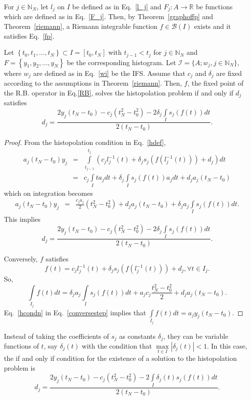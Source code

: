 \documentclass[sn-mathphys-num]{sn-jnl}
\numberwithin{equation}{section}
\begin{document}
\noindent For $j\in\mathbb N_N$, let $l_j$ on $I$ be defined as in Eq.~\eqref{l_j} and $F_j: A\rightarrow\mathbb{R}$ be functions which are defined as in Eq.~\eqref{F_j}. Then, by Theorem~\ref{graphoffp} and Theorem~\ref{riemann}, a Riemann integrable function $f\in\mathcal{B}(I)$ exists and it satisfies Eq.~\eqref{fp}.
\begin{theorem}
Let $\left\{t_0,t_1,\ldots, t_N\right\}\subset I=[t_0,t_N]$ with $t_{j-1} < t_j$ for $j\in\mathbb N_N$ and $F=\left\{y_1,y_2,\ldots, y_N\right\}$ be the corresponding histogram. Let $\mathcal{I}=\{A;w_j,j\in\mathbb N_N\}$, where $w_j$ are defined as in Eq.~\eqref{wi} be the IFS. Assume that $c_j$ and $\delta_j$ are fixed according to the assumptions in Theorem~\ref{riemann}. Then, $f$, the fixed point of the R.B. operator in Eq.\eqref{RB}, solves the histopolation problem if and only if $d_j$ satisfies
\begin{equation}
d_j=\frac{2y_j(t_N-t_0)-c_j(t_N^2-t_0^2)-2\delta_j\int\limits_Is_j(f(t))dt}{2(t_N-t_0)}.\label{hcondn}
\end{equation}
\end{theorem}
\begin{proof}
From the histopolation condition in Eq.~\eqref{hdef},
\begin{eqnarray*}
a_j(t_N-t_0)y_j %
&=&\int\limits_{t_{j-1}}^{t_j}(c_jl_j^{-1}(t)+\delta_js_j(f(l_j^{-1}(t)))+d_j)dt\\
&=&c_j\int\limits_{I}ta_jdt+\delta_j\int\limits_{I}s_j(f(t))a_jdt+d_ja_j(t_N-t_0)
\end{eqnarray*}
which on integration becomes
\begin{eqnarray*}
a_j(t_N-t_0)y_j&=&\frac{c_ja_j}{2}(t_N^2-t_0^2)+d_ja_j(t_N-t_0)+\delta_ja_j\int\limits_{I}s_j(f(t))dt.
\end{eqnarray*}
This implies $$d_j=\frac{2y_j(t_N-t_0)-c_j(t_N^2-t_0^2)-2\delta_j\int\limits_Is_j(f(t))dt}{2(t_N-t_0)}.$$

Conversely,  $f$ satisfies 
\begin{equation*}
	f(t)=c_jl_j^{-1}(t)+\delta_js_j(f(l_j^{-1}(t)))+d_j, \forall t\in I_j.
\end{equation*}
So,
\begin{equation}
	\int\limits_{I_j}f(t)dt=\delta_ja_j\int\limits_{I}s_j(f(t))dt+a_jc_j\frac{t_N^2-t_0^2}{2}+d_ja_j(t_N-t_0).\label{conversestep}
\end{equation}
Eq.~\eqref{hcondn} in Eq.~\eqref{conversestep} implies that $\int\limits_{I_j}f(t)dt=a_jy_j(t_N-t_0)$.
\end{proof}
\begin{remark}
Instead of taking the coefficients of $s_j$ as constants $\delta_j$, they can be variable functions of $t$, say $\delta_j(t)$ with the condition that $\max\limits_{t\in I}|\delta_j(t)|<1$. In this case, the if and only if condition for the existence of a solution to the histopolation problem is
\begin{equation*}
    d_j=\frac{2y_j(t_N-t_0)-c_j(t_N^2-t_0^2)-2\int\limits_{I}\delta_j(t)s_j(f(t))dt}{2(t_N-t_0)}.
\end{equation*}
\end{remark}
\end{document}
